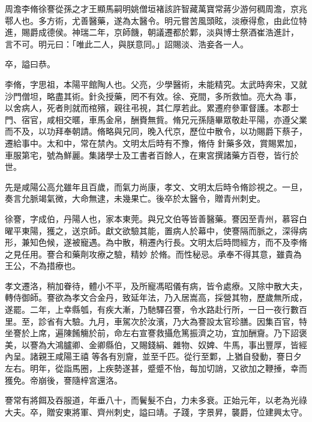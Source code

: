 
\begin{pinyinscope}

 周澹李脩徐謇從孫之才王顯馬嗣明姚僧垣褚該許智藏萬寶常蔣少游何稠周澹，京兆鄠人也。多方術，尤善醫藥，遂為太醫令。明元嘗苦風頭眩，淡療得愈，由此位特進，賜爵成德侯。神瑞二年，京師饑，朝議遷都於鄴，淡與博士祭酒崔浩進計，
 言不可。明元曰：「唯此二人，與朕意同。」詔賜淡、浩妾各一人。



 卒，謚曰恭。



 李脩，字思祖，本陽平館陶人也。父亮，少學醫術，未能精究。太武時奔宋，又就沙門僧坦，略盡其術。針灸授藥，罔不有效。徐、兗間，多所救恤。亮大為事，以舍病人，死者則就而棺殯，親往弔視，其仁厚若此。累遷府參軍督護。本郡士門、宿官，咸相交暱，車馬金帛，酬賚無貲。脩兄元孫隨畢眾敬赴平陽，亦遵父業而不及，以功拜奉朝請。脩略與兄同，晚入代京，歷位中散令，以功賜爵下蔡子，遷給事中。太和中，常在禁內。文明太后時有不豫，脩侍
 針藥多效，賞賜累加，車服第宅，號為鮮麗。集諸學士及工書者百餘人，在東宮撰諸藥方百卷，皆行於世。



 先是咸陽公高允雖年且百歲，而氣力尚康，孝文、文明太后時令脩診視之。一旦，奏言允脈竭氣微，大命無逮，未幾果亡。後卒於太醫令，贈青州刺史。



 徐謇，字成伯，丹陽人也，家本東莞。與兄文伯等皆善醫藥。謇因至青州，慕容白曜平東陽，獲之，送京師。獻文欲驗其能，置病人於幕中，使謇隔而脈之，深得病形，兼知色候，遂被寵遇。為中散，稍遷內行長。文明太后時問經方，而不及李脩之見任用。謇合和藥劑攻療之驗，精妙
 於脩。而性秘忌。承奉不得其意，雖貴為王公，不為措療也。



 孝文遷洛，稍加眷待，體小不平，及所寵馮昭儀有病，皆令處療。又除中散大夫，轉侍御師。謇欲為孝文合金丹，致延年法，乃入居嵩高，採營其物，歷歲無所成，遂罷。二年，上幸縣瓠，有疾大漸，乃馳驛召謇，令水路赴行所，一日一夜行數百里。至，診省有大驗。九月，車駕次於汝濱，乃大為謇設太官珍膳。因集百官，特坐謇於上席，遍陳餚觴於前，命左右宣謇救攝危篤振濟之功，宜加酬齎。乃下詔褒美，以謇為大鴻臚卿、金卿縣伯，又賜錢絹、雜物、奴婢、牛馬，事出豐厚，皆經內呈。諸親王咸陽王禧
 等各有別齎，並至千匹。從行至鄴，上猶自發動，謇日夕左右。明年，從詣馬圈，上疾勢遂甚，蹙蹙不怡，每加切誚，又欲加之鞭捶，幸而獲免。帝崩後，謇隨梓宮還洛。



 謇常有將餌及吞服道，年垂八十，而鬢髮不白，力未多衰。正始元年，以老為光祿大夫。卒，贈安東將軍、齊州刺史，謚曰靖。子踐，字景昇，襲爵，位建興太守。




\end{pinyinscope}
